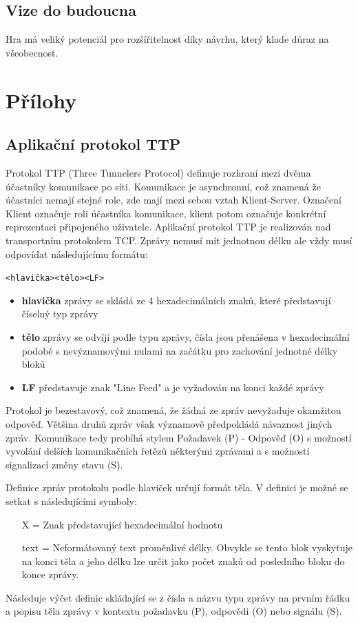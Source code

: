 \documentclass[12pt,a4paper]{article}
\let\oldsection\section
\renewcommand\section{\clearpage\oldsection}
\begin{document}
\subsection{Vize do budoucna}
Hra má veliký potenciál pro rozšířitelnost díky návrhu, který klade důraz na všeobecnost.

\section{Přílohy}
\subsection{Aplikační protokol TTP}
Protokol TTP (Three Tunnelers Protocol) definuje rozhraní mezi dvěma účastníky komunikace po síti. Komunikace je asynchronní, což znamená že účastníci nemají stejné role, zde mají mezi sebou vztah Klient-Server. Označení Klient označuje roli účastníka komunikace, klient potom označuje konkrétní reprezentaci připojeného uživatele.
Aplikační protokol TTP je realizován nad transportním protokolem TCP. Zprávy nemusí mít jednotnou délku ale vždy musí odpovídat následujícímu formátu:
\begin{center}
\texttt{<hlavička><tělo><LF>}
\end{center}
\begin{itemize}
\setlength\itemsep{0em}
\item \textbf{hlavička} zprávy se skládá ze 4 hexadecimálních znaků, které představují číselný typ zprávy
\item \textbf{tělo} zprávy se odvíjí podle typu zprávy, čísla jsou přenášena v hexadecimální podobě s nevýznamovými nulami na začátku pro zachování jednotné délky bloků
\item \textbf{LF} představuje znak "Line Feed" a je vyžadován na konci každé zprávy
\end{itemize}

Protokol je bezestavový, což znamená, že žádná ze zpráv nevyžaduje okamžitou odpověď. Většina druhů zpráv však významově předpokládá návaznost jiných zpráv.
Komunikace tedy probíhá stylem Požadavek (P) - Odpověď (O) s možností vyvolání delších komunikačních řetězů některými zprávami a s možností signalizací změny stavu (S).

Definice zpráv protokolu podle hlaviček určují formát těla. V definici je možné se setkat s následujícími symboly:
\begin{itemize}
\item[X] = Znak představující hexadecimální hodnotu
\item[text] = Neformátovaný text proměnlivé délky. Obvykle se tento blok vyskytuje na konci těla a jeho délku lze určit jako počet znaků od posledního bloku do konce zprávy.
\end{itemize}
Následuje výčet definic skládající se z čísla a názvu typu zprávy na prvním řádku a popisu těla zprávy v kontextu požadavku (P), odpovědi (O) nebo signálu (S).
\newpage
\end{document}
